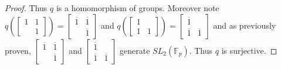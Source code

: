 \documentclass{article}
\newcommand{\F}{\mathbb{F}}
\begin{document}
\begin{proof}
    Thus $q$ is a homomorphism of groups. Moreover note $q\left(\begin{bmatrix}
        1 & 1 \\ & 1
    \end{bmatrix}\right) = \begin{bmatrix}
        \overline{1} & \overline{1} \\ & \overline{1}
    \end{bmatrix}$ and $q\left(\begin{bmatrix}
        1 \\ 1 & 1
    \end{bmatrix}\right) = \begin{bmatrix}
        \overline{1} \\ \overline{1} & \overline{1}
    \end{bmatrix}$ and as previously proven, $\begin{bmatrix}
        \overline{1} & \overline{1} \\ & \overline{1}
    \end{bmatrix}$ and $ \begin{bmatrix}
        \overline{1} \\ \overline{1} & \overline{1}
    \end{bmatrix}$ generate $SL_2(\F_p)$. Thus $q$ is surjective.       
\end{proof}
\end{document}
